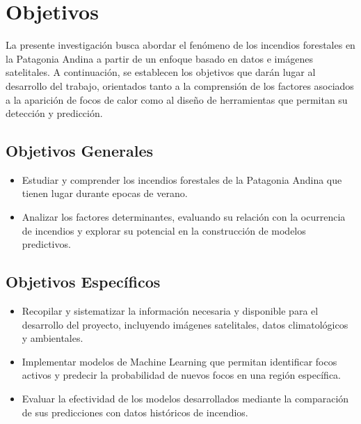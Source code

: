 \section{Objetivos}
La presente investigación busca abordar el fenómeno de los incendios forestales en la Patagonia Andina a partir de un enfoque basado en datos e imágenes satelitales. A continuación, se establecen los objetivos que darán lugar al desarrollo del trabajo, orientados tanto a la comprensión de los factores asociados a la aparición de focos de calor como al diseño de herramientas que permitan su detección y predicción.

\subsection{Objetivos Generales}
\begin{itemize}
    \item Estudiar y comprender los incendios forestales de la Patagonia Andina que tienen lugar durante epocas de verano.
    \item Analizar los factores determinantes, evaluando su relación con la ocurrencia de incendios y explorar su potencial en la construcción de modelos predictivos.
\end{itemize}

\subsection{Objetivos Específicos}
\begin{itemize}
    \item Recopilar y sistematizar la información necesaria y disponible para el desarrollo del proyecto, incluyendo imágenes satelitales, datos climatológicos y ambientales.
    \item Implementar modelos de Machine Learning que permitan identificar focos activos y predecir la probabilidad de nuevos focos en una región específica.
    \item Evaluar la efectividad de los modelos desarrollados mediante la comparación de sus predicciones con datos históricos de incendios.
\end{itemize}
